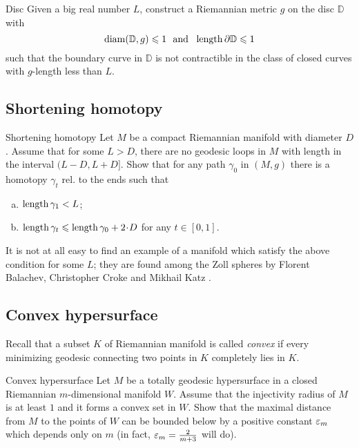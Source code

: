 \begin{pr}{\hard}{Disc}\label{Disc}
Given a big real number $L$,
construct a Riemannian metric $g$ on the disc $\mathbb D$ 
with 
\[\diam(\mathbb D,g)\le 1
\ \ 
\text{and}
\ \ 
\length \partial\mathbb D\le 1  \]
such that the boundary curve in $\mathbb D$ is not contractible in the class of closed curves with $g$-length less than $L$.
\end{pr}

\subsection*{Shortening homotopy}

\begin{pr}{}{Shortening homotopy}\label{short-homotopy}
Let $M$ be a compact Riemannian manifold with diameter $D$.
Assume that for some $L>D$,
there are no geodesic loops in $M$
with length in the interval $(L-D,L+ D]$.
Show that for any path $\gamma_0$ in $(M,g)$
there is a homotopy $\gamma_t$ rel. to the ends
such that 
\begin{enumerate}[a)]
\item $\operatorname{\rm length} \gamma_1<L$;
\item $\length \gamma_t\le \length \gamma_0+2\cdot D$ for any $t\in[0,1]$.
 
\end{enumerate}
\end{pr}

It is not at all easy to find an example of a manifold  which satisfy the above condition for some $L$;
they are found among the Zoll spheres
by Florent Balachev, Christopher Croke and Mikhail Katz \cite[see][]{balacheff-croke-katz}.



\subsection*{Convex hypersurface}

Recall that a subset $K$ of Riemannian manifold is called \emph{convex} if every minimizing geodesic connecting two  points in $K$ completely lies in $K$. 

\begin{pr}{}{Convex hypersurface}\label{Convex hypersurface}
Let $M$ be a totally geodesic hypersurface 
in a closed Riemannian $m$-dimensional manifold $W$.
Assume that the injectivity radius of $M$ is at least $1$
and it forms a convex set in $W$.
Show that the maximal distance from $M$ to the points of $W$ can be bounded below by a positive constant $\varepsilon_m$ which depends only on $m$ (in fact, $\varepsilon_m=\tfrac2{m+3}$ will do).
\end{pr}


